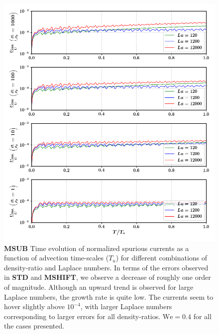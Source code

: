 \begin{figure}[h!]
    \centering
    \includegraphics[]{plots/droplet_advect/evo_sagar.png}
	\caption{\textbf{MSUB} Time evolution of normalized spurious currents as a function of advection time-scales ($T_u$) for different combinations of density-ratio and Laplace numbers. In terms of the errors observed in \textbf{STD} and \textbf{MSHIFT}, we observe a decrease of roughly one order of magnitude. Although an upward trend is observed for large Laplace numbers, the growth rate is quite low. The currents seem to hover slightly above $10^{-4}$, with larger Laplace numbers corresponding to larger errors for all density-ratios. $\textrm{We} = 0.4$ for all the cases presented.}   
    \label{evo_sagar}
\end{figure}


